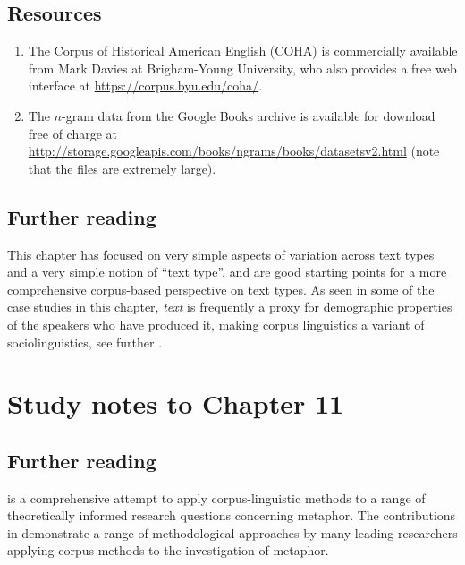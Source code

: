 \subsection*{Resources}

\begin{enumerate}
  \item The Corpus of Historical American English (COHA) is commercially available from Mark Davies at Brigham-Young University, who also provides a free web interface at \url{https://corpus.byu.edu/coha/}.
  \item The $n$-gram data from the Google Books archive is available for download free of charge at \url{http://storage.googleapis.com/books/ngrams/books/datasetsv2.html} (note that the files are extremely large).
\end{enumerate}

\subsection*{Further reading}

This chapter has focused on very simple aspects of variation across text types and a very simple notion of “text type”. \citet{biber_variation_1988} and \citet{biber_typology_1989} are good starting points for a more comprehensive corpus-based perspective on text types. As seen in some of the case studies in this chapter, \textit{text} is frequently a proxy for demographic properties of the speakers who have produced it, making corpus linguistics a variant of sociolinguistics, see further \citet{baker_sociolinguistics_2010}.

\section*{Study notes to Chapter 11}
\label{sec:studynotes11}

\subsection*{Further reading}

\citet{deignan_metaphor_2005} is a comprehensive attempt to apply corpus-linguistic methods to a range of theoretically informed research questions concerning metaphor. The contributions in \citet{stefanowitsch_corpus-based_2006} demonstrate a range of methodological approaches by many leading researchers applying corpus methods to the investigation of metaphor.

